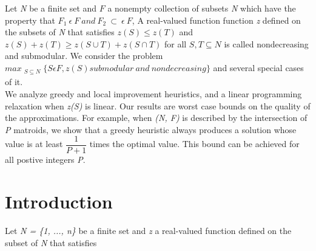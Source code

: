 \documentclass[11pt,a4paper,oneside]{report}
\begin{document}




Let \textit{N} be a finite set and $F$ a nonempty collection of subsets \textit{N} which have the property that $F_1\  \epsilon\  F\  and\  F_2\  \subset\  \epsilon\  F$, A real-valued function function \textit{z} defined on the subsets of \textit{N} that satisfies $z(S) \leq z(T)$ and $z(S) + z(T) \geq z(S \cup T) + z(S \cap T)$ for all $S, T \subseteq N$ is called nondecreasing and submodular. We consider the problem 
$max_{\substack{S\subseteq N}}\{S\epsilon F, z(S)  submodular\  and\  nondecreasing\}$ and several special cases of it.\\
We analyze greedy and local improvement heuristics, and a linear programming relaxation when \textit{z(S)} is linear. Our results are worst case bounds on the quality of the approximations. For example, when \textit{(N, F)} is described by the intersection of \textit{P} matroids, we show that a greedy heuristic always produces a solution whose value is at least $\dfrac{1}{P+1}$ times the optimal value. This bound can be achieved for all postive integers \textit{P}. 

\section{Introduction}
Let \textit{N = \{1, ..., n\}} be a finite set and \textit{z} a real-valued function defined on the subset of \textit{N} that satisfies\\
\end{document}
